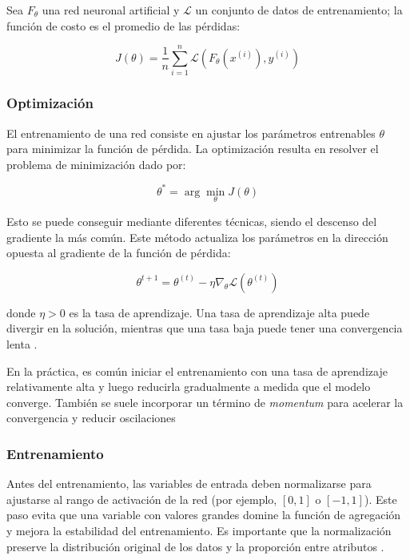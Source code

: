 \begin{definition}
	
	Sea $F_\theta$ una red neuronal artificial y $\mathcal{L}$ un conjunto de datos de entrenamiento; la función de costo es el promedio de las pérdidas:
	
	\[
	J(\theta) = \frac{1}{n} \sum_{i = 1}^{n} \mathcal{L}(F_\theta(x^{(i)}), y^{(i)})
	\]
	
\end{definition}

\subsubsection{Optimización}

El entrenamiento de una red consiste en ajustar los parámetros entrenables $\theta$ para minimizar la función de pérdida. La optimización resulta en resolver el problema de minimización dado por:

\[
\theta^* = \arg \min_{\theta} J(\theta)
\]

Esto se puede conseguir mediante diferentes técnicas, siendo el descenso del gradiente la más común. Este método actualiza los parámetros en la dirección opuesta al gradiente de la función de pérdida:

\[
\theta^{t + 1} = \theta^{(t)} - \eta  \nabla_\theta \mathcal{L}(\theta^{(t)})
\]

donde $\eta >0$ es la tasa de aprendizaje. Una tasa de aprendizaje alta puede divergir en la solución, mientras que una tasa baja puede tener una convergencia lenta \cite{ann_3}. 

En la práctica, es común iniciar el entrenamiento con una tasa de aprendizaje relativamente alta y luego reducirla gradualmente a medida que el modelo converge. También se suele incorporar un término de \textit{momentum }para acelerar la convergencia y reducir oscilaciones \cite{ann_extra}

\subsubsection{Entrenamiento}

Antes del entrenamiento, las variables de entrada deben normalizarse para ajustarse al rango de activación de la red (por ejemplo, $[0,1]$ o $[-1,1]$). Este paso evita que una variable con valores grandes domine la función de agregación y mejora la estabilidad del entrenamiento. Es importante que la normalización preserve la distribución original de los datos y la proporción entre atributos \cite{ann_extra}.

